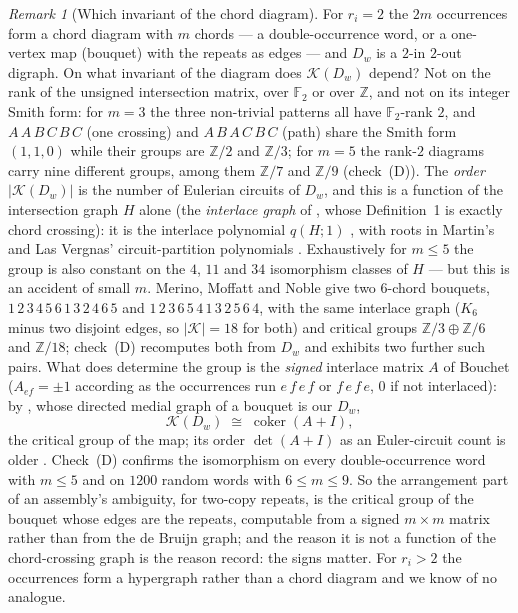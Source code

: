\documentclass[11pt]{article}
\theoremstyle{plain}
\theoremstyle{definition}
\theoremstyle{remark}
\newtheorem{remark}[theorem]{Remark}
\newcommand{\Z}{\mathbb{Z}}
\newcommand{\F}{\mathbb{F}}
\newcommand{\K}{\mathcal{K}}
\newcommand{\coker}{\operatorname{coker}}
\begin{document}
\begin{remark}[Which invariant of the chord diagram]\label{rem:chord}
For $r_i=2$ the $2m$ occurrences form a chord diagram with $m$ chords --- a
double-occurrence word, or a one-vertex map (bouquet) with the repeats as edges --- and
$D_w$ is a $2$-in $2$-out digraph. On what invariant of the diagram does $\K(D_w)$
depend? Not on the rank of the unsigned intersection matrix, over $\F_2$ or over $\Z$,
and not on its integer Smith form: for $m=3$ the three non-trivial patterns all have
$\F_2$-rank $2$, and $A\,A\,B\,C\,B\,C$ (one crossing) and $A\,B\,A\,C\,B\,C$ (path)
share the Smith form $(1,1,0)$ while their groups are $\Z/2$ and $\Z/3$; for $m=5$ the
rank-$2$ diagrams carry nine different groups, among them $\Z/7$ and $\Z/9$
(check~(D)). The \emph{order} $|\K(D_w)|$ is the number of Eulerian circuits of $D_w$,
and this is a function of the intersection graph $H$ alone (the \emph{interlace graph}
of \cite{ABS}, whose Definition~1 is exactly chord crossing): it is the interlace
polynomial $q(H;1)$ \cite[Thm.~9, Cor.~13]{ABS}, with roots in Martin's and Las Vergnas'
circuit-partition polynomials \cite{LasVergnas}. Exhaustively for $m\le5$ the group is
also constant on the $4$, $11$ and $34$ isomorphism classes of $H$ --- but this is an
accident of small $m$. Merino, Moffatt and Noble \cite[Rem.~6.7]{MMN} give two
$6$-chord bouquets, $1\,2\,3\,4\,5\,6\,1\,3\,2\,4\,6\,5$ and
$1\,2\,3\,6\,5\,4\,1\,3\,2\,5\,6\,4$, with the same interlace graph ($K_6$ minus two
disjoint edges, so $|\K|=18$ for both) and critical groups $\Z/3\oplus\Z/6$ and
$\Z/18$; check~(D) recomputes both from $D_w$ and exhibits two further such pairs. What
does determine the group is the \emph{signed} interlace matrix $A$ of Bouchet
($A_{ef}=\pm1$ according as the occurrences run $e\,f\,e\,f$ or $f\,e\,f\,e$, $0$ if
not interlaced): by \cite[Thm.~7.3]{MMN}, whose directed medial graph of a bouquet is
our $D_w$,
\[
\K(D_w)\;\cong\;\coker(A+I),
\]
the critical group of the map; its order $\det(A+I)$ as an Euler-circuit count is older
\cite{MacrisPule,Jonsson}. Check~(D) confirms the isomorphism on every double-occurrence
word with $m\le5$ and on $1200$ random words with $6\le m\le9$. So the arrangement part
of an assembly's ambiguity, for two-copy repeats, is the critical group of the bouquet
whose edges are the repeats, computable from a signed $m\times m$ matrix rather than
from the de Bruijn graph; and the reason it is not a function of the chord-crossing
graph is the reason \cite{MMN} record: the signs matter. For $r_i>2$ the occurrences
form a hypergraph rather than a chord diagram and we know of no analogue.
\end{remark}
\end{document}
